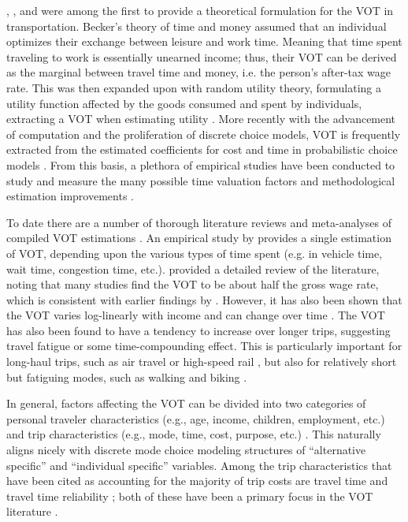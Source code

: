 \documentclass[numbered]{trbunofficial}\usepackage[]{graphicx}\usepackage[]{color}
\begin{document}
\citet{Becker1965}, \citet{Beesley1965}, and \citet{Johnson1966} were among the first to provide a theoretical formulation for the VOT in transportation. Becker's theory of time and money assumed that an individual optimizes their exchange between leisure and work time. Meaning that time spent traveling to work is essentially unearned income; thus, their VOT can be derived as the marginal between travel time and money, i.e. the person's after-tax wage rate. This was then expanded upon with random utility theory, formulating a utility function affected by the goods consumed and spent by individuals, extracting a VOT when estimating utility \citep{DeSerpa1971,Evans1972,Hensher1976}. More recently with the advancement of computation and the proliferation of discrete choice models, VOT is frequently extracted from the estimated coefficients for cost and time in probabilistic choice models \citep{McFadden1981,Ben-Akiva1997,Hensher2001,Train2009}. From this basis, a plethora of empirical studies have been conducted to study and measure the many possible time valuation factors and methodological estimation improvements \citep{Steimetz2005,DeBorger2008}.

To date there are a number of thorough literature reviews and meta-analyses of compiled VOT estimations \citep{Wardman2001,Abrantes2011,Shires2009}. An empirical study by \citet{Abrantes2011} provides a single estimation of VOT, depending upon the various types of time spent (e.g. in vehicle time, wait time, congestion time, etc.). \citet{Small2012} provided a detailed review of the literature, noting that many studies find the VOT to be about half the gross wage rate, which is consistent with earlier findings by \citet{Lave1969}. However, it has also been shown that the VOT varies log-linearly with income and can change over time \citep{Johnson1966,Borjesson2012}. The VOT has also been found to have a tendency to increase over longer trips, suggesting travel fatigue or some time-compounding effect. This is particularly important for long-haul trips, such as air travel \citep{Merkert2017} or high-speed rail \citep{Hultkrantz2013}, but also for relatively short but fatiguing modes, such as walking and biking \citep{Wichman2017}.

In general, factors affecting the VOT can be divided into two categories of personal traveler characteristics (e.g., age, income, children, employment, etc.) and trip characteristics (e.g., mode, time, cost, purpose, etc.) \citep{Borjesson2014}. This naturally aligns nicely with discrete mode choice modeling structures of ``alternative specific'' and ``individual specific'' variables. Among the trip characteristics that have been cited as accounting for the majority of trip costs are travel time and travel time reliability \citep{Small2007}; both of these have been a primary focus in the VOT literature \citep{Small2005,Uchida2014,Kouwenhoven2014}. 
\end{document}
